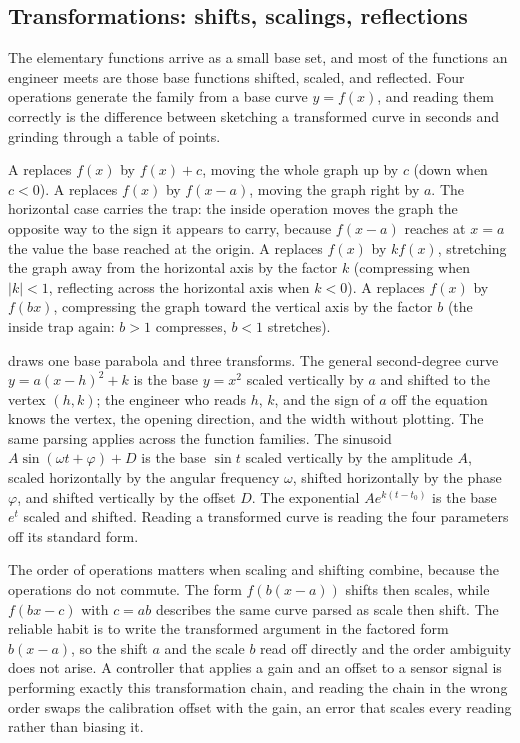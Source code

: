 \subsection{Transformations: shifts, scalings, reflections}

The elementary functions arrive as a small base set, and most of the
functions an engineer meets are those base functions shifted, scaled,
and reflected. Four operations generate the family from a base curve
$y = f(x)$, and reading them correctly is the difference between
sketching a transformed curve in seconds and grinding through a table
of points.

A  replaces $f(x)$ by $f(x) + c$, moving the
whole graph up by $c$ (down when $c < 0$). A  replaces $f(x)$ by $f(x - a)$, moving the graph right by $a$.
The horizontal case carries the trap: the inside operation moves the
graph the opposite way to the sign it appears to carry, because
$f(x - a)$ reaches at $x = a$ the value the base reached at the
origin. A  replaces $f(x)$ by $k f(x)$,
stretching the graph away from the horizontal axis by the factor $k$
(compressing when $|k| < 1$, reflecting across the horizontal axis
when $k < 0$). A  replaces $f(x)$ by
$f(bx)$, compressing the graph toward the vertical axis by the factor
$b$ (the inside trap again: $b > 1$ compresses, $b < 1$ stretches).



 draws one base parabola and
three transforms. The general second-degree curve $y = a(x - h)^{2}
+ k$ is the base $y = x^{2}$ scaled vertically by $a$ and shifted to
the vertex $(h, k)$; the engineer who reads $h$, $k$, and the sign of
$a$ off the equation knows the vertex, the opening direction, and the
width without plotting. The same parsing applies across the function
families. The sinusoid $A \sin(\omega t + \varphi) + D$ is the base
$\sin t$ scaled vertically by the amplitude $A$, scaled horizontally
by the angular frequency $\omega$, shifted horizontally by the phase
$\varphi$, and shifted vertically by the offset $D$. The exponential
$A e^{k(t - t_{0})}$ is the base $e^{t}$ scaled and shifted. Reading
a transformed curve is reading the four parameters off its standard
form.

The order of operations matters when scaling and shifting combine,
because the operations do not commute. The form $f(b(x - a))$ shifts
then scales, while $f(bx - c)$ with $c = ab$ describes the same curve
parsed as scale then shift. The reliable habit is to write the
transformed argument in the factored form $b(x - a)$, so the shift
$a$ and the scale $b$ read off directly and the order ambiguity does
not arise. A controller that applies a gain and an offset to a sensor
signal is performing exactly this transformation chain, and reading
the chain in the wrong order swaps the calibration offset with the
gain, an error that scales every reading rather than biasing it.

